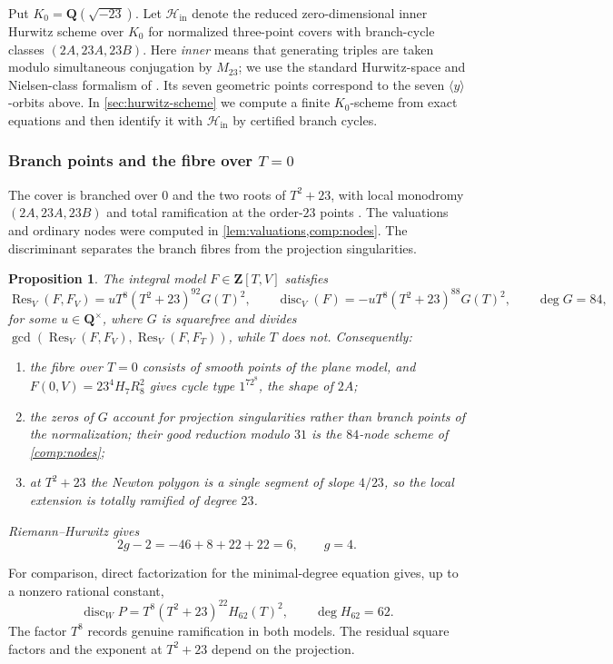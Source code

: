 \documentclass[11pt]{amsart}
\newtheorem{proposition}[proposition]{Proposition}
\theoremstyle{definition}
\theoremstyle{remark}
\newcommand{\QQ}{\mathbf Q}
\newcommand{\ZZ}{\mathbf Z}
\newcommand{\Res}{\operatorname{Res}}
\newcommand{\disc}{\operatorname{disc}}
\begin{document}
Put $K_0=\QQ(\sqrt{-23})$.  Let $\mathcal H_{\mathrm{in}}$ denote the
reduced zero-dimensional inner Hurwitz scheme over $K_0$ for normalized
three-point covers with branch-cycle classes $(2A,23A,23B)$.  Here
\emph{inner} means that generating triples are taken modulo simultaneous
conjugation by $M_{23}$; we use the standard Hurwitz-space and Nielsen-class
formalism of \cite{FriedVolklein}.  Its seven geometric points correspond to the
seven $\langle y\rangle$-orbits above.  In
\cref{sec:hurwitz-scheme} we compute a finite \(K_0\)-scheme from exact
equations and then identify it with $\mathcal H_{\mathrm{in}}$ by certified
branch cycles.

\subsubsection{Branch points and the fibre over \texorpdfstring{$T=0$}{T=0}}

The cover is branched over $0$ and the two roots of $T^2+23$, with local
monodromy $(2A,23A,23B)$ and total ramification at the order-$23$ points
\cite[Section~3]{HJLPPZ}.  The valuations and ordinary nodes were computed
in \cref{lem:valuations,comp:nodes}.  The discriminant separates the branch
fibres from the projection singularities.

\begin{proposition}\label{thm:branch}
The integral model $F\in\ZZ[T,V]$ satisfies
\[
 \Res_V(F,F_V)=uT^8(T^2+23)^{92}G(T)^2,
 \qquad
 \disc_V(F)=-uT^8(T^2+23)^{88}G(T)^2,
 \qquad \deg G=84,
\]
for some $u\in\QQ^\times$, where $G$ is squarefree and divides
$\gcd(\Res_V(F,F_V),\Res_V(F,F_T))$, while $T$ does not.  Consequently:
\begin{enumerate}
\item the fibre over $T=0$ consists of smooth points of the plane model,
  and $F(0,V)=23^4H_7R_8^2$ gives cycle type $1^72^8$, the shape of $2A$;
\item the zeros of $G$ account for projection singularities rather than
  branch points of the normalization; their good reduction modulo $31$ is
  the $84$-node scheme of \cref{comp:nodes};
\item at $T^2+23$ the Newton polygon is a single segment of slope $4/23$,
  so the local extension is totally ramified of degree $23$.
\end{enumerate}
Riemann--Hurwitz gives
\[
 2g-2=-46+8+22+22=6,
 \qquad g=4.
\]
\end{proposition}

For comparison, direct factorization for the minimal-degree equation gives,
up to a
nonzero rational constant,
\[
 \disc_WP=T^8(T^2+23)^{22}H_{62}(T)^2,
 \qquad \deg H_{62}=62.
\]
The factor $T^8$ records genuine ramification in both models.  The residual
square factors and the exponent at $T^2+23$ depend on the projection.
\end{document}
